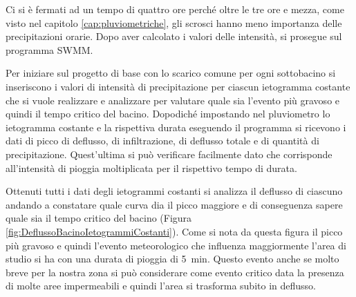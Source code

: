 Ci si è fermati ad un tempo di quattro ore perché oltre le tre ore e mezza, come visto nel capitolo \ref{cap:pluviometriche}, gli scrosci hanno meno importanza delle precipitazioni orarie.
Dopo aver calcolato i valori delle intensità, si prosegue sul programma SWMM.

Per iniziare sul progetto di base con lo scarico comune per ogni sottobacino si inseriscono i valori di intensità di precipitazione per ciascun ietogramma costante che si vuole realizzare e analizzare per valutare quale sia l'evento più gravoso e quindi il tempo critico del bacino. 
Dopodiché impostando nel pluviometro lo ietogramma costante e la rispettiva durata eseguendo il programma si ricevono i dati di picco di deflusso, di infiltrazione, di deflusso totale e di quantità di precipitazione.
Quest'ultima si può verificare facilmente dato che corrisponde all'intensità di pioggia moltiplicata per il rispettivo tempo di durata.

Ottenuti tutti i dati degli ietogrammi costanti si analizza il deflusso di ciascuno andando a constatare quale curva dia il picco maggiore e di conseguenza sapere quale sia il tempo critico del bacino (Figura \ref{fig:DeflussoBacinoIetogrammiCostanti}). 
Come si nota da questa figura il picco più gravoso e quindi l'evento meteorologico che influenza maggiormente l'area di studio si ha con una durata di pioggia di \SI{5}{\minute}.
Questo evento anche se molto breve per la nostra zona si può considerare come evento critico data la presenza di molte aree impermeabili e quindi l'area si trasforma subito in deflusso.

